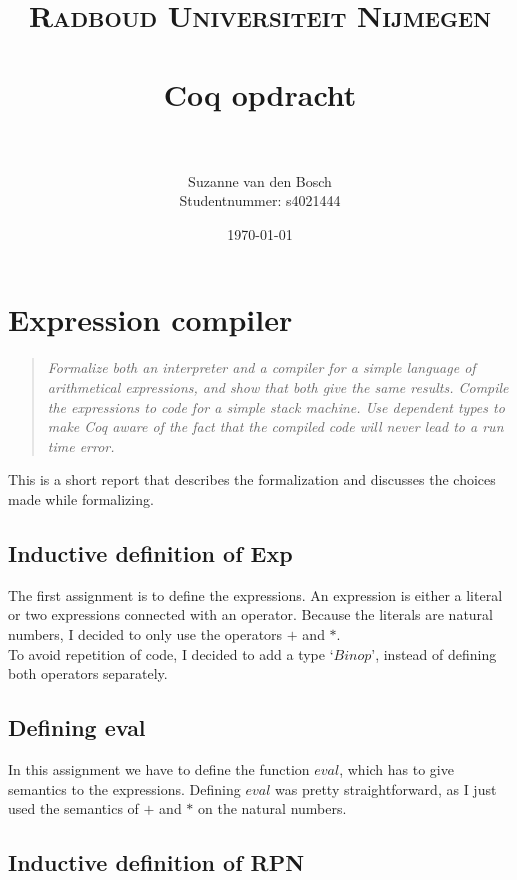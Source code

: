 \documentclass[paper=a4, fontsize=11pt]{scrartcl} %
\title{	
\normalfont \normalsize 
\textsc{Radboud Universiteit Nijmegen} \\ [25pt] %
\horrule{0.5pt} \\[0.4cm] %
\huge Coq opdracht \\ %
\horrule{2pt} \\[0.5cm] %
}
\author{Suzanne van den Bosch \\ Studentnummer: s4021444} %
\date{\normalsize\today} %
\numberwithin{equation}{section} %
\numberwithin{figure}{section} %
\numberwithin{table}{section} %
\begin{document}
\maketitle %


\section{Expression compiler}

\begin{quote}
\textit{Formalize both an interpreter and a compiler for a simple language of arithmetical expressions, and show that both give the same results. Compile the expressions to code for a simple stack machine. Use dependent types to make Coq aware of the fact that the compiled code will never lead to a run time error.}
\end{quote}

This is a short report that describes the formalization and discusses the choices made while formalizing.

\subsection{Inductive definition of Exp}
The first assignment is to define the expressions. An expression is either a literal or two expressions connected with an operator. Because the literals are natural numbers, I decided to only use the operators $+$ and $*$.\\  
To avoid repetition of code, I decided to add a type `$Binop$', instead of defining both operators separately. 

\subsection{Defining eval}
In this assignment we have to define the function $eval$, which has to give semantics to the expressions.
Defining $eval$ was pretty straightforward, as I just used the semantics of $+$ and $*$ on the natural numbers.

\subsection{Inductive definition of RPN}
\end{document}
